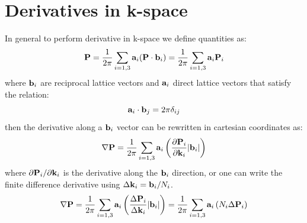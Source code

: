 \documentclass[preprint,showpacs,prb,superscriptaddress,aps,floatfix]{revtex4-1}
\newcommand{\ab}{{\bf a}}
\newcommand{\bb}{{\bf b}}
\newcommand{\PP}{{\bf P}}
\newcommand{\kk}{{\bf k}}
\newcommand{\be}{\begin{equation}}
\newcommand{\ee}{\end{equation}}
\renewcommand{\[}{\left[}
\renewcommand{\]}{\right]}
\renewcommand{\(}{\left(}
\renewcommand{\)}{\right)}
\begin{document}
\section{Derivatives in k-space}
In general to perform derivative in k-space we define quantities as:
\be
\PP = \frac{1}{2\pi} \sum_{i=1,3} \ab_i (\PP \cdot \bb_i) = \frac{1}{2\pi} \sum_{i=1,3} \ab_i \PP_i
\ee
where $\bb_i$ are reciprocal lattice vectors and $\ab_i$ direct lattice vectors that satisfy the relation:
\be
\ab_i \cdot \bb_j = 2\pi\delta_{ij}
\ee
then the derivative along a $\bb_i$ vector can be rewritten in cartesian coordinates as:
\be
\nabla \PP = \frac{1}{2\pi} \sum_{i=1,3} \ab_i \left( \frac{\partial \PP_i}{\partial \kk_i} |\bb_i| \right)
\ee 
where $\partial \PP_i/\partial \kk_i$ is the derivative along the $\bb_i$ direction, or one can write the finite difference derivative using $\Delta \kk_i = \bb_i/N_i$.
\be
\nabla \PP = \frac{1}{2\pi} \sum_{i=1,3} \ab_i \left( \frac{\Delta \PP_i}{\Delta \kk_i}  |\bb_i|  \right) = \frac{1}{2\pi} \sum_{i=1,3} \ab_i \left( N_i \Delta \PP_i \right)
\ee 



\end{document}
